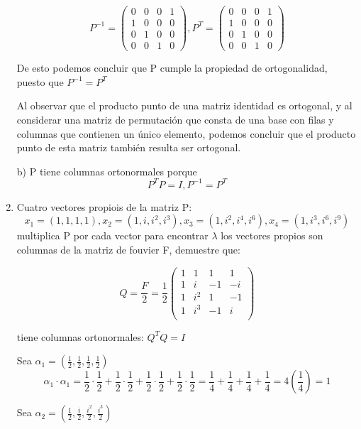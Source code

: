 \documentclass{report}
\begin{document}
\begin{enumerate}
    $$P^{-1}=\begin{pmatrix}
        0 & 0 & 0 & 1\\
        1 & 0 & 0 & 0\\
        0 & 1 & 0 & 0\\
        0 & 0 & 1 & 0 
    \end{pmatrix}
    ,P^{T}=\begin{pmatrix}
        0 & 0 & 0 & 1\\
        1 & 0 & 0 & 0\\
        0 & 1 & 0 & 0\\
        0 & 0 & 1 & 0 
    \end{pmatrix}$$
    
    De esto podemos concluir que P cumple la propiedad de ortogonalidad, puesto que $P^{-1}=P^T$
    
    Al observar que el producto punto de una matriz identidad es ortogonal, y al considerar una matriz de permutación que consta de una base con filas y columnas que contienen un único elemento, podemos concluir que el producto punto de esta matriz también resulta ser ortogonal. 
    
    b) P tiene columnas ortonormales porque $$P^TP=I, P^{-1}=P^T$$
    
    
    \item Cuatro vectores propiois de la matriz P:
    $$x_1=(1,1,1,1),x_2=(1,i,i^2,i^3),x_3=(1,i^2,i^4,i^6),x_4=(1,i^3,i^6,i^9)$$
    multiplica P por cada vector para encontrar $\lambda$ los vectores propios son columnas de la matriz de fouvier F, demuestre que:
    
    $$Q=\frac{F}{2}=\frac{1}{2}\begin{pmatrix}
        1&1&1&1\\
        1&i&-1&-i\\
        1&i^2&1&-1\\
        1&i^3&-1&i\\
    \end{pmatrix}$$
    
    tiene columnas ortonormales: $Q^{T}Q=I$
    
    Sea $\alpha_1=(\frac{1}{2},\frac{1}{2},\frac{1}{2},\frac{1}{2})$
    $$\alpha_1\cdot\alpha_1=\frac{1}{2}\cdot\frac{1}{2}+\frac{1}{2}\cdot\frac{1}{2}+\frac{1}{2}\cdot\frac{1}{2}+\frac{1}{2}\cdot\frac{1}{2}=\frac{1}{4}+\frac{1}{4}+\frac{1}{4}+\frac{1}{4}=4(\frac{1}{4})=1$$
    
    Sea $\alpha_2=(\frac{1}{2},\frac{i}{2},\frac{i^2}{2},\frac{i^3}{2})$
    

\end{enumerate}
\end{document}
